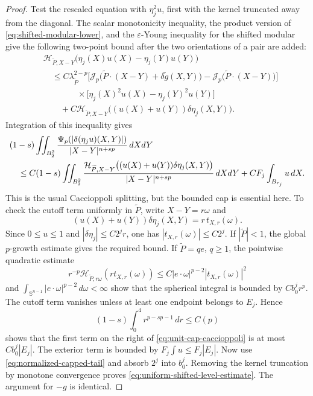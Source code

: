 \documentclass[11pt,reqno]{amsart}
\numberwithin{equation}{section}
\newcommand{\Jp}{\mathcal J_p}
\newcommand{\dd}{\,d}
\theoremstyle{remark}
\begin{document}
\begin{proof}
Test the rescaled equation with \(\eta_j^2u\), first with the kernel
truncated away from the diagonal.  The scalar monotonicity inequality,
the product version of \eqref{eq:shifted-modular-lower}, and the
\(\varepsilon\)-Young inequality for the shifted
modular give the following two-point bound after the two orientations
of a pair are added:
\begin{align*}
 &\mathcal H_{\widetilde P,X-Y}
       \bigl(\eta_j(X)u(X)-\eta_j(Y)u(Y)\bigr)\\
 &\quad\le C\lambda_{\widetilde P}^{2-p}
 \bigl[\Jp\bigl(\widetilde P\cdot(X-Y)
       +\delta\widetilde g(X,Y)\bigr)
       -\Jp\bigl(\widetilde P\cdot(X-Y)\bigr)\bigr]\\
 &\qquad\qquad\times
 \bigl[\eta_j(X)^2u(X)-\eta_j(Y)^2u(Y)\bigr]\\
 &\qquad+C\mathcal H_{\widetilde P,X-Y}
 \bigl((u(X)+u(Y))\delta\eta_j(X,Y)\bigr).
\end{align*}
Integration of this inequality gives
\begin{align}
 &(1-s)\iint_{B_2^2}
 \frac{\Psi_p(|\delta(\eta_ju)(X,Y)|)}
 {|X-Y|^{n+sp}}\dd X\!\dd Y\notag\\
 &\quad\le C(1-s)\iint_{B_2^2}
 \frac{\mathcal H_{\widetilde P,X-Y}
 \bigl((u(X)+u(Y))\delta\eta_j(X,Y)\bigr)}
 {|X-Y|^{n+sp}}\dd X\!\dd Y
 +CF_j\int_{B_{r_j}}u\dd X.
 \label{eq:unit-cap-caccioppoli}
\end{align}
This is the usual Caccioppoli splitting, but the bounded cap is
essential here.  To check the cutoff term uniformly in
\(\widetilde P\), write \(X-Y=r\omega\) and
\[
 (u(X)+u(Y))\delta\eta_j(X,Y)=r\,t_{X,r}(\omega).
\]
Since \(0\le u\le1\) and \(|\delta\eta_j|\le C2^jr\), one has
\(|t_{X,r}(\omega)|\le C2^j\).  If \(|\widetilde P|<1\), the global
\(p\)-growth estimate gives the required bound.  If
\(\widetilde P=qe\), \(q\ge1\), the pointwise quadratic estimate
\[
 r^{-p}\mathcal H_{\widetilde P,r\omega}
       (r t_{X,r}(\omega))
 \le C|e\cdot\omega|^{p-2}|t_{X,r}(\omega)|^2
\]
and \(\int_{\mathbb S^{n-1}}|e\cdot\omega|^{p-2}\dd\omega<\infty\)
show that the spherical integral is bounded by \(Cb_0^jr^p\).
The cutoff term vanishes unless at least one endpoint belongs to
\(E_j\).  Hence
\[
 (1-s)\int_0^4 r^{p-sp-1}\dd r\le C(p)
\]
shows that the first term on the right of
\eqref{eq:unit-cap-caccioppoli} is at most \(Cb_0^j|E_j|\).
The exterior term is bounded by \(F_j\int u\le F_j|E_j|\).
Now use \eqref{eq:normalized-capped-tail} and absorb \(2^j\) into
\(b_0^j\).  Removing the kernel truncation by monotone convergence
proves \eqref{eq:uniform-shifted-level-estimate}.  The argument for
\(-g\) is identical.
\end{proof}
\end{document}
